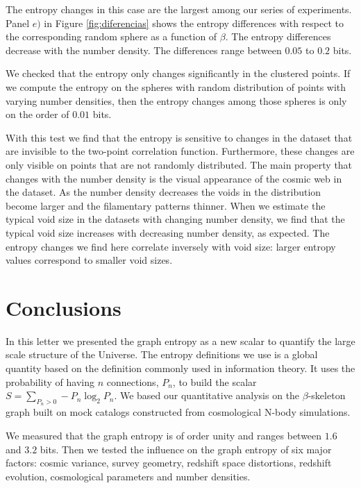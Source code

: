 \documentclass[fleqn,usenatbib]{mnras}
\begin{document}
The entropy changes in this case are the largest among our series of experiments.
Panel $e)$ in Figure \ref{fig:diferencias} shows the entropy differences 
with respect to the corresponding random sphere as a function
of $\beta$.
The entropy differences decrease with the number density. 
The differences range between $0.05$ to $0.2$ bits.

We checked that the entropy only changes significantly in the clustered points.
If we compute the entropy on the spheres with random distribution of points 
with varying number densities, then the entropy changes among those spheres 
is only on the order of $0.01$ bits.

With this test we find that the entropy is sensitive to changes in the 
dataset that are invisible to the two-point correlation function.
Furthermore, these changes are only visible on points that are not randomly
distributed.
The main property that changes with the number density is the visual appearance of the
cosmic web in the dataset. 
As the number density decreases the voids in the distribution become
larger and the filamentary patterns thinner.
When we estimate the typical void size in the datasets with changing number 
density, we find that the typical void size increases with decreasing number density, 
as expected.
The entropy changes we find here correlate inversely with void size: larger entropy 
values correspond to smaller void sizes.




\section{Conclusions}

In this letter we presented the graph entropy as a new scalar to 
quantify the large scale structure of the Universe.
The entropy definitions we use is a global quantity based on 
the definition commonly used in information theory.
It uses the probability of having $n$ connections, $P_n$, to build the 
scalar $S=\sum_{P_n>0} -P_n  \log_2 P_n$. 
We based our quantitative analysis on the $\beta$-skeleton graph 
built on mock catalogs constructed from cosmological N-body simulations.

We measured that the graph entropy is of order unity and ranges 
between $1.6$ and $3.2$ bits.
Then we tested the influence on the graph entropy of six major factors: 
cosmic variance, survey geometry, redshift space distortions, redshift evolution, cosmological parameters and number densities.
\end{document}
